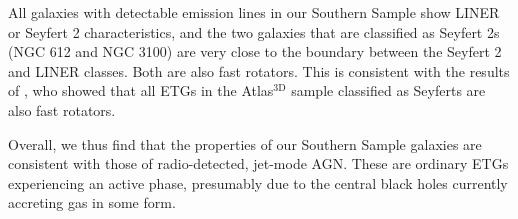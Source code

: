 	All galaxies with detectable emission lines in our Southern Sample show LINER or Seyfert 2 characteristics, and the two galaxies that are classified as Seyfert 2s (NGC 612 and NGC 3100) are very close to the boundary between the Seyfert 2 and LINER classes. Both are also fast rotators. This is consistent with the results of \citet{Nyland2016}, who showed that all ETGs in the Atlas$^\text{3D}$ sample classified as Seyferts are also fast rotators. 

	Overall, we thus find that the properties of our Southern Sample galaxies are consistent with those of radio-detected, jet-mode AGN. These are ordinary ETGs experiencing an active phase, presumably due to the central black holes currently accreting gas in some form. 

